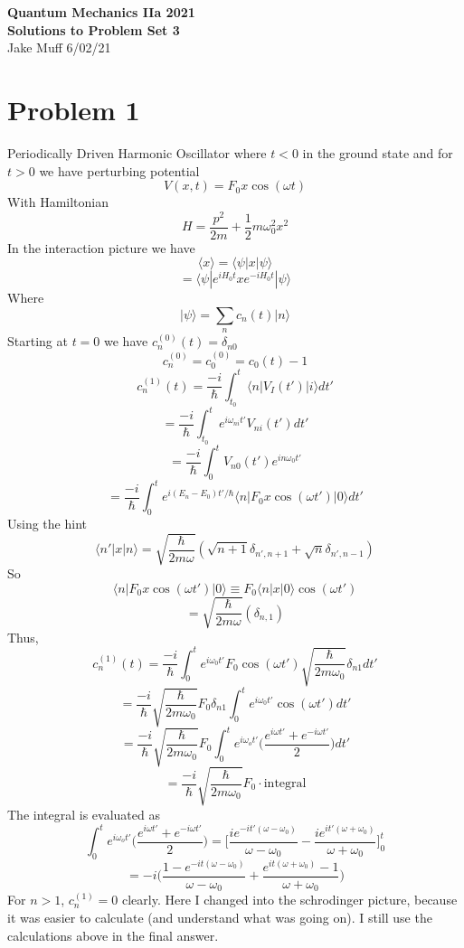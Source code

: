 \documentclass[12pt]{article}
\newcommand{\ket}[1]{\vert{#1}\rangle}
\begin{document}
\normalsize

\baselineskip 14pt

\begin{center}
{\Large {\bf Quantum Mechanics IIa 2021 \ \ \\ Solutions to Problem Set 3}} \\
Jake Muff
6/02/21
\end{center}
\section*{Problem 1}
Periodically Driven Harmonic Oscillator where $t < 0$ in the ground state and for $t >0$ we have perturbing potential 
$$ V(x,t) = F_0 x \cos (\omega t) $$
With Hamiltonian 
$$ H = \frac{p^2}{2m} + \frac{1}{2} m \omega_0^2 x^2 $$
In the interaction picture we have 
$$ \langle x \rangle = \langle \psi | x | \psi \rangle $$
$$ = \langle \psi | e^{i H_0 t} x  e^{-i H_0 t} | \psi \rangle $$
Where 
\begin{equation} \ket{\psi} = \sum_n c_n (t) \ket{n} \end{equation}
Starting at $t=0$ we have  $c_n^{(0)} (t) = \delta_{n0} $
$$ c_n^{(0)} = c_0^{(0)} = c_0 (t) -1 $$
$$ c_n^{(1)} (t) = \frac{-i}{\hbar} \int_{t_0}^t \langle n | V_I (t') | i \rangle dt' $$
$$ = \frac{-i}{\hbar} \int_{t_0}^t e^{i \omega_{ni} t'} V_{ni} (t') dt' $$
$$ = \frac{-i}{\hbar} \int_0^t V_{n0} (t') e^{in \omega_0 t'} $$
$$ = \frac{-i}{\hbar} \int_0^t e^{i(E_n - E_0)t' / \hbar} \langle n | F_0 x \cos (\omega t') | 0 \rangle dt' $$
Using the hint 
$$ \langle n' | x | n \rangle = \sqrt{\frac{\hbar}{2 m \omega}} ( \sqrt{n+1} \delta_{n', n+1} + \sqrt{n} \delta_{n', n-1} ) $$
So 
$$ \langle n | F_0 x \cos (\omega t' ) | 0 \rangle \equiv F_0 \langle n | x | 0 \rangle \cos (\omega t' ) $$
$$ = \sqrt{\frac{\hbar}{2m \omega}} ( \delta_{n,1} ) $$
Thus,
$$ c_n^{(1)} (t) = \frac{-i}{\hbar} \int_0^t e^{i \omega_0 t'} F_0 \cos( \omega t') \sqrt{\frac{\hbar}{2 m \omega_0}} \delta_{n1} dt' $$
$$ = \frac{-i}{\hbar} \sqrt{\frac{\hbar}{2m \omega_0}} F_0 \delta_{n1} \int_0^t e^{i \omega_0 t'} \cos (\omega t') dt' $$
$$ = \frac{-i}{\hbar} \sqrt{\frac{\hbar}{2m \omega_0}} F_0 \int_0^t e^{i \omega_o t'} \Big( \frac{e^{i \omega t'} + e^{-i \omega t'}}{2} \Big) dt' $$
$$ = \frac{-i}{\hbar} \sqrt{\frac{\hbar}{2m \omega_0}} F_0 \cdot \text{integral} $$
The integral is evaluated as 
$$ \int_0^t e^{i \omega_o t'} \Big( \frac{e^{i \omega t'} + e^{-i \omega t'}}{2} \Big) =  \Big[ \frac{ie^{-it'(\omega - \omega_0)}}{\omega - \omega_0} - \frac{i e^{it' (\omega + \omega_0)}}{\omega + \omega_0} \Big]^t_0 $$
$$ = -i \Big( \frac{1-e^{-it (\omega - \omega_0) }}{\omega - \omega_0} + \frac{e^{it(\omega + \omega_0) }-1}{\omega + \omega_0} \Big) $$
For $n>1$, $ c_n^{(1)} =0 $ clearly. 
Here I changed into the schrodinger picture, because it was easier to calculate (and understand what was going on). I still use the calculations above in the final answer. 
\end{document}
